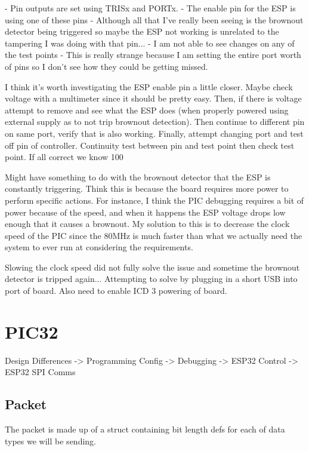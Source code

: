     - Pin outputs are set using TRISx and PORTx.
    - The enable pin for the ESP is using one of these pins
        - Although all that I've really been seeing
        is the brownout detector being triggered
        so maybe the ESP not working is unrelated to the
        tampering I was doing with that pin...
    - I am not able to see changes on any of the test points
        - This is really strange because I am setting the entire port
        worth of pins so I don't see how they could be getting missed.

I think it's worth investigating the ESP enable pin a little closer.
Maybe check voltage with a multimeter since it should be pretty easy.
Then, if there is voltage attempt to remove and see what the ESP does
(when properly powered using external supply as to not trip
brownout detection).
Then continue to different pin on same port, verify that is also working.
Finally, attempt changing port and test off pin of controller.
Continuity test between pin and test point then check test point.
If all correct we know 100%

Might have something to do with the brownout detector that the ESP is constantly triggering.
Think this is because the board requires more power to perform specific actions.
For instance, I think the PIC debugging requires a bit of power because of the speed,
and when it happens the ESP voltage drops low enough that it causes a brownout.
My solution to this is to decrease the clock speed of the PIC since the 80MHz is much
faster than what we actually need the system to ever run at considering the requirements.

Slowing the clock speed did not fully solve the issue and sometime the brownout detector
is tripped again...
Attempting to solve by plugging in a short USB into port of board.
Also need to enable ICD 3 powering of board.

\section{PIC32}
Design Differences -> Programming Config -> Debugging -> ESP32 Control -> ESP32 SPI Comms

\subsection{Packet}
%
The packet is made up of a struct containing bit length defs
for each of data types we will be sending.

